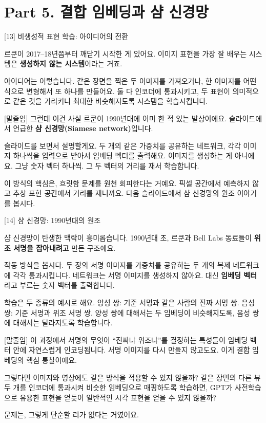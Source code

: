 \documentclass[aspectratio=169,10pt]{beamer}
\newenvironment{script}{%
  \footnotesize
  \setlength{\parskip}{0.5em}
  \setlength{\parindent}{0pt}
}{}
\begin{document}
\section{Part 5. 결합 임베딩과 샴 신경망}

\begin{frame}{[13] 비생성적 표현 학습: 아이디어의 전환}
\begin{script}
르쿤이 2017--18년쯤부터 깨닫기 시작한 게 있어요. 이미지 표현을 가장 잘 배우는 시스템은 \textbf{생성하지 않는 시스템}이라는 거죠.

아이디어는 이렇습니다. 같은 장면을 찍은 두 이미지를 가져오거나, 한 이미지를 어떤 식으로 변형해서 또 하나를 만들어요. 둘 다 인코더에 통과시키고, 두 표현이 의미적으로 같은 것을 가리키니 최대한 비슷해지도록 시스템을 학습시킵니다.

[말줄임] 그런데 이건 사실 르쿤이 1990년대에 이미 한 적 있는 발상이에요. 슬라이드에서 언급한 \textbf{샴 신경망(Siamese network)}입니다.

슬라이드를 보면서 설명할게요. 두 개의 같은 가중치를 공유하는 네트워크, 각각 이미지 하나씩을 입력으로 받아서 임베딩 벡터를 출력해요. 이미지를 생성하는 게 아니에요. 그냥 숫자 벡터 하나씩. 그 두 벡터의 거리를 재서 학습합니다.

이 방식의 핵심은, 흐릿함 문제를 원천 회피한다는 거예요. 픽셀 공간에서 예측하지 않고 추상 표현 공간에서 거리를 재니까요. 다음 슬라이드에서 샴 신경망의 원조 이야기를 봅시다.
\end{script}
\end{frame}

\begin{frame}{[14] 샴 신경망: 1990년대의 원조}
\begin{script}
샴 신경망이 탄생한 맥락이 흥미롭습니다. 1990년대 초, 르쿤과 Bell Labs 동료들이 \textbf{위조 서명을 잡아내려고} 만든 구조예요.

작동 방식을 봅시다. 두 장의 서명 이미지를 가중치를 공유하는 두 개의 복제 네트워크에 각각 통과시킵니다. 네트워크는 서명 이미지를 생성하지 않아요. 대신 \textbf{임베딩 벡터}라고 부르는 숫자 벡터를 출력합니다.

학습은 두 종류의 예시로 해요. 양성 쌍: 기준 서명과 같은 사람의 진짜 서명 쌍. 음성 쌍: 기준 서명과 위조 서명 쌍. 양성 쌍에 대해서는 두 임베딩이 비슷해지도록, 음성 쌍에 대해서는 달라지도록 학습합니다.

[말줄임] 이 과정에서 서명의 무엇이 ``진짜냐 위조냐''를 결정하는 특성들이 임베딩 벡터 안에 자연스럽게 인코딩됩니다. 서명 이미지를 다시 만들지 않고도요. 이게 결합 임베딩의 핵심 통찰이에요.

그렇다면 이미지와 영상에도 같은 방식을 적용할 수 있지 않을까? 같은 장면의 다른 뷰 두 개를 인코더에 통과시켜 비슷한 임베딩으로 매핑하도록 학습하면, GPT가 사전학습으로 유용한 표현을 얻듯이 일반적인 시각 표현을 얻을 수 있지 않을까?

문제는, 그렇게 단순할 리가 없다는 거였어요.
\end{script}
\end{frame}
\end{document}
